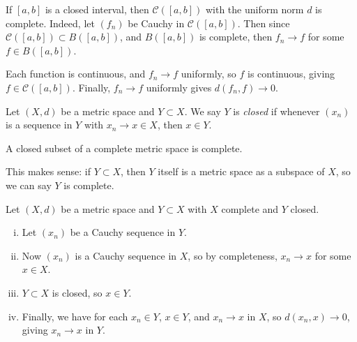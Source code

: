 \documentclass[12pt]{article}
\begin{document}
\begin{exbox}
	If $[a, b]$ is a closed interval, then $\mathcal{C}([a, b])$ with the uniform norm $d$ is complete. Indeed, let $(f_n)$ be Cauchy in $\mathcal{C}([a, b])$. Then since $\mathcal{C}([a, b]) \subset B([a, b])$, and $B([a, b])$ is complete, then $f_n \to f$ for some $f \in B([a, b])$.

	Each function is continuous, and $f_n \to f$ uniformly, so $f$ is continuous, giving $f \in \mathcal{C}([a, b])$. Finally, $f_n \to f$ uniformly gives $d(f_n, f) \to 0$.
\end{exbox}

\begin{definition}
	Let $(X, d)$ be a metric space and $Y \subset X$. We say $Y$ is \textit{closed} if whenever $(x_n)$ is a sequence in $Y$ with $x_n \to x \in X$, then $x \in Y$.
\end{definition}

\begin{proposition}
	A closed subset of a complete metric space is complete.
\end{proposition}

\begin{remark}
	This makes sense: if $Y \subset X$, then $Y$ itself is a metric space as a subspace of $X$, so we can say $Y$ is complete.
\end{remark}

\begin{proofbox}
	Let $(X, d)$ be a metric space and $Y \subset X$ with $X$ complete and $Y$ closed.
	\begin{enumerate}[(i)]
		\item Let $(x_n)$ be a Cauchy sequence in $Y$.
		\item Now $(x_n)$ is a Cauchy sequence in $X$, so by completeness, $x_n \to x$ for some $x \in X$.
		\item $Y \subset X$ is closed, so $x \in Y$.
		\item Finally, we have for each $x_n \in Y$, $x \in Y$, and $x_n \to x$ in $X$, so $d(x_n, x) \to 0$, giving $x_n \to x$ in $Y$.
	\end{enumerate}
\end{proofbox}
\end{document}
